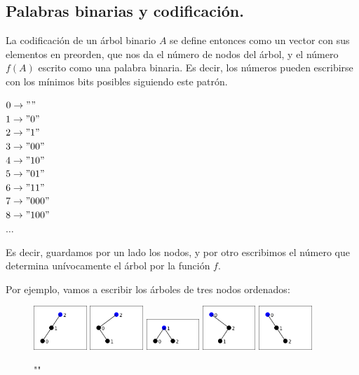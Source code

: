 \documentclass{article}
\begin{document}
\subsection {Palabras binarias y codificación.}
La codificación de un árbol binario $A$ se define entonces como un vector con sus elementos en preorden, que nos da el número de nodos
del árbol, y el número $f(A)$ escrito como una palabra binaria. Es decir, los números pueden escribirse con los mínimos bits posibles siguiendo este patrón.
\begin{adjustwidth}{2cm}{}
 $0 \rightarrow ""$\\
 $1 \rightarrow "0"$ \\
 $2 \rightarrow "1"$ \\
 $3 \rightarrow "00"$ \\
 $4 \rightarrow "10"$ \\
 $5 \rightarrow "01"$ \\
 $6 \rightarrow "11"$ \\
 $7 \rightarrow "000"$ \\
 $8 \rightarrow "100"$ \\
 $\dots$ \\
\end{adjustwidth}

Es decir, guardamos por un lado los nodos, y por otro escribimos el número que determina unívocamente el árbol por la función $f$.

Por ejemplo, vamos a escribir los árboles de tres nodos ordenados: \\
\begin{figure}[ht!]
\centering
\includegraphics[width=20mm]{0.png}
\includegraphics[width=20mm]{1.png}
\includegraphics[width=20mm]{2.png}
\includegraphics[width=20mm]{3.png}
\includegraphics[width=20mm]{4.png}
\caption{""}
\label{overflow}
\end{figure}
\end{document}
